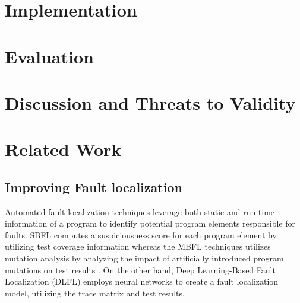 \documentclass[sigconf]{acmart}
\begin{document}
\begin{comment}
This document uses the following string as the first command in the
source file:
\begin{verbatim}
\documentclass[sigconf]{acmart}
\end{verbatim}
\end{comment}

\section{Implementation}

\section{Evaluation}

\section{Discussion and Threats to Validity}

\section{Related Work}
	\subsection{Improving Fault localization}
		
	Automated fault localization techniques leverage both static and run-time information of a program to identify potential program elements responsible for faults. SBFL computes a suspiciousness score for each program element by utilizing test coverage information whereas the MBFL techniques utilizes mutation analysis by analyzing the impact of artificially introduced program mutations on test results . On the other hand, Deep Learning-Based Fault Localization (DLFL) employs neural networks to create a fault localization model, utilizing the trace matrix and test results.
	
\end{document}
